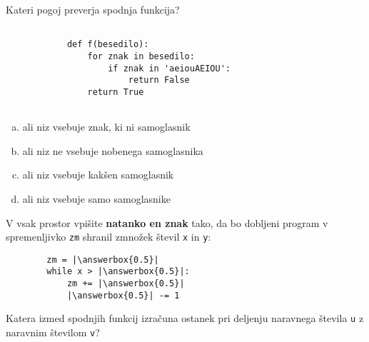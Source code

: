 \documentclass[arhiv, 10pt]{../izpit}
\newcommand{\inlinepy}[1]{\texttt{#1}}
\newcommand{\answerbox}[1]{\framebox{\vphantom{\large M}\hspace{#1cm}}}
\begin{document}
        \naloga*

        \begin{multicols}{2}
        \noindent
        Kateri pogoj preverja spodnja funkcija?
        \begin{verbatim}
        
            def f(besedilo):
                for znak in besedilo:
                    if znak in 'aeiouAEIOU':
                        return False
                return True
            
        \end{verbatim}

        \begin{enumerate}[(a)]
\item ali niz vsebuje znak, ki ni samoglasnik
\item ali niz ne vsebuje nobenega samoglasnika
\item ali niz vsebuje kakšen samoglasnik
\item ali niz vsebuje samo samoglasnike
\end{enumerate}

        \end{multicols}
    
        \naloga*
        \begin{multicols}{2}
        \noindent
        V vsak prostor vpišite \textbf{natanko en znak} tako, da bo dobljeni program v spremenljivko \inlinepy{zm} shranil zmnožek števil \inlinepy{x} in \inlinepy{y}:
        
        \columnbreak
        \begin{verbatim}
        zm = |\answerbox{0.5}|
        while x > |\answerbox{0.5}|:
            zm += |\answerbox{0.5}|
            |\answerbox{0.5}| -= 1
        \end{verbatim}
        \end{multicols}
    
        \clearpage
        \naloga
        
        Katera izmed spodnjih funkcij izračuna ostanek pri deljenju naravnega števila \inlinepy{u} z naravnim številom \inlinepy{v}?
    
\end{document}
